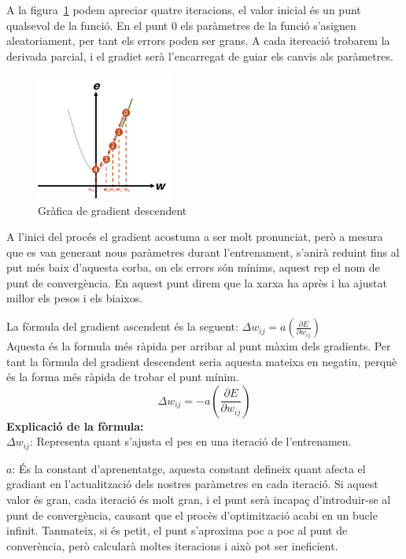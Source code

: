           A la figura~\ref{GraficaDescendet} podem apreciar quatre iteracions, el valor inicial és un punt qualsevol de la funció. En el punt 0 els paràmetres de la funció s'asignen aleatoriament, per tant els errors poden ser grans. A cada itereació  trobarem la derivada parcial, i el gradiet serà l'encarregat de guiar els canvis als paràmetres.

        \begin{figure}[h]
         \centering
         \includegraphics[width=0.4\textwidth]{./figures/gradient_descendent.png}
        \caption{Gràfica de gradient descendent}
        \label{GraficaDescendet}
         \end{figure}

          A l'inici del procés el gradient acostuma a ser molt pronunciat, però a mesura que es van generant nous paràmetres durant l'entrenament, s'anirà reduint fins al put més baix d'aquesta corba, on els errors són mínims, aquest rep el nom de punt de convergència. En aquest punt direm que la xarxa ha après i ha ajustat millor els pesos i els biaixos.

          La fòrmula del gradient ascendent és la seguent: $\Delta w_{ij} = a \left( \frac{\partial E}{\partial w_{ij}} \right)$\\

          Aquesta és la formula més ràpida per arribar al punt màxim dels gradients. Per tant la fòrmula del gradient descendent seria aquesta mateixa en negatiu, perquè és la forma més ràpida de trobar el punt mínim.
          $$\Delta w_{ij} = -a \left( \frac{\partial E}{\partial w_{ij}} \right)$$
          \textbf{Explicació de la fòrmula:}\\
           $\Delta w_{ij}$: Representa quant s'ajusta el pes en una iteració de l'entrenamen.

           $a$: És la constant d'aprenentatge, aquesta constant defineix quant afecta el gradiant en l'actualització dels nostres paràmetres en cada iteració. Si aquest valor és gran, cada iteració és molt gran, i el punt serà incapaç d'introduir-se al punt de convergència, causant que el procès d'optimització acabi en un bucle infinit. Tanmateix, si és petit, el punt s'aproxima poc a poc al punt de converència, però calcularà moltes iteracions i això pot ser ineficient.

